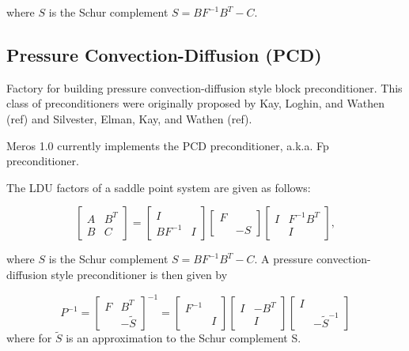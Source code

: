 \documentclass[oneeqnum,onefignum,onetabnum,10pt]{SANDreport}
\begin{document}
where $S$ is the Schur complement $S = B F^{-1} B^T - C$.





\subsection{Pressure Convection-Diffusion (PCD)}
Factory for building pressure convection-diffusion style block
preconditioner. This class of preconditioners were originally proposed
by Kay, Loghin, and Wathen (ref) and Silvester, Elman, Kay, and Wathen
(ref).

Meros 1.0 currently implements the PCD preconditioner, a.k.a. Fp
preconditioner. 

The LDU factors of a saddle point system are given as follows:

\begin{equation}
  \left[ \begin{array}{cc} A & B^T \\ B & C \end{array} \right]
     = \left[ \begin{array}{cc} I & \\ BF^{-1} & I \end{array} \right]
       \left[ \begin{array}{cc} F & \\  & -S \end{array} \right]
       \left[ \begin{array}{cc} I & F^{-1} B^T  \\  & I \end{array} \right],
\end{equation}

where $S$ is the Schur complement $S = B F^{-1} B^T - C$.  A
pressure convection-diffusion style preconditioner is then given by

\begin{equation}
  P^{-1} =
       \left[ \begin{array}{cc} F & B^T \\ & -\tilde S \end{array} \right]^{-1}
       = 
       \left[ \begin{array}{cc} F^{-1} &  \\  & I \end{array} \right]
       \left[ \begin{array}{cc} I & -B^T \\  & I \end{array} \right]
       \left[ \begin{array}{cc} I &  \\  & -\tilde S^{-1} \end{array} \right]
\end{equation}
where for $\tilde S$ is an approximation to the Schur complement S.
\end{document}
